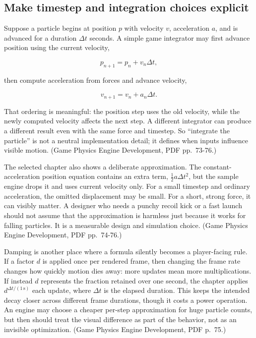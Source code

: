\subsection{Make timestep and integration choices explicit}\label{05-engine-i-ch014-make-timestep-and-integration-choices-explicit}

Suppose a particle begins at position \(p\) with velocity \(v\), acceleration \(a\), and is advanced for a duration \(\Delta t\) seconds. A simple game integrator may first advance position using the current velocity,

\[p_{n+1}=p_n+v_n\Delta t,\]

then compute acceleration from forces and advance velocity,

\[v_{n+1}=v_n+a_n\Delta t.\]

That ordering is meaningful: the position step uses the old velocity, while the newly computed velocity affects the next step. A different integrator can produce a different result even with the same force and timestep. So ``integrate the particle'' is not a neutral implementation detail; it defines when inputs influence visible motion. (Game Physics Engine Development, PDF pp.~73-76.)

The selected chapter also shows a deliberate approximation. The constant-acceleration position equation contains an extra term, \(\frac{1}{2}a\Delta t^2\), but the sample engine drops it and uses current velocity only. For a small timestep and ordinary acceleration, the omitted displacement may be small. For a short, strong force, it can visibly matter. A designer who needs a punchy recoil kick or a fast launch should not assume that the approximation is harmless just because it works for falling particles. It is a measurable design and simulation choice. (Game Physics Engine Development, PDF pp.~74-76.)

Damping is another place where a formula silently becomes a player-facing rule. If a factor \(d\) is applied once per rendered frame, then changing the frame rate changes how quickly motion dies away: more updates mean more multiplications. If instead \(d\) represents the fraction retained over one second, the chapter applies \(d^{\Delta t/(1\,\mathrm{s})}\) each update, where \(\Delta t\) is the elapsed duration. This keeps the intended decay closer across different frame durations, though it costs a power operation. An engine may choose a cheaper per-step approximation for huge particle counts, but then should treat the visual difference as part of the behavior, not as an invisible optimization. (Game Physics Engine Development, PDF p.~75.)


